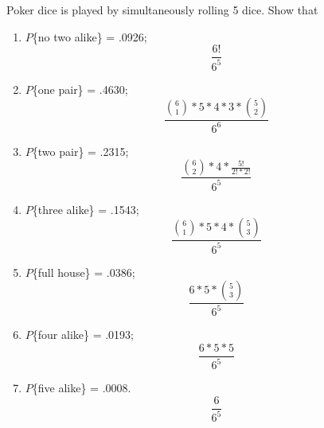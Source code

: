\item Poker dice is played by simultaneously rolling 5 dice. Show that
\begin{enumerate}
    \item $P$\{no two alike\} = .0926;
    \[ \frac{6!}{6^5} \]
    \item $P$\{one pair\} = .4630;
    \[ \frac{\binom{6}{1} * 5 * 4 * 3 * \binom{5}{2}}{6^6} \]
    \item $P$\{two pair\} = .2315;
    \[ \frac{\binom{6}{2} * 4 * \frac{5!}{2!*2!}}{6^5} \]
    \item $P$\{three alike\} = .1543;
    \[ \frac{\binom{6}{1} * 5 * 4 * \binom{5}{3}}{6^5} \]
    \item $P$\{full house\} = .0386;
    \[ \frac{6 * 5 * \binom{5}{3}}{6^5} \]
    \item $P$\{four alike\} = .0193;
    \[ \frac{6 * 5 * 5}{6^5} \]
    \item $P$\{five alike\} = .0008.
    \[ \frac{6}{6^5} \]
\end{enumerate}